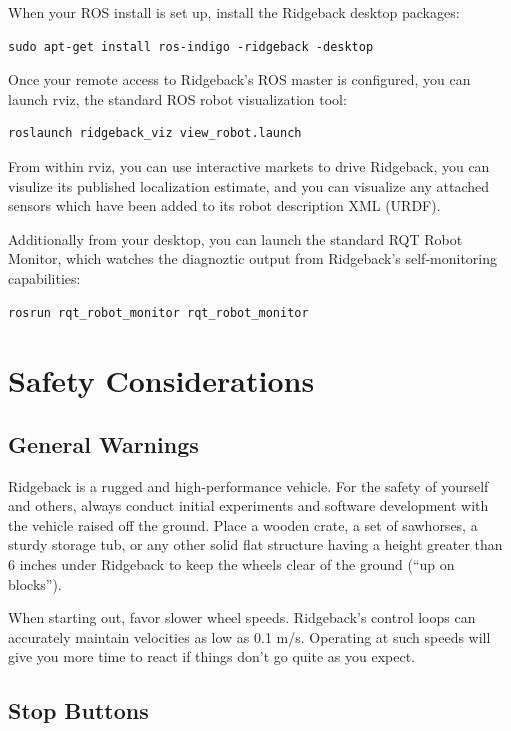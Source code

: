 \documentclass[]{clearpath-latex/clearpath-manual}
\begin{document}
When your ROS install is set up, install the Ridgeback desktop packages:

\begin{lstlisting}
sudo apt-get install ros-indigo -ridgeback -desktop
\end{lstlisting}

Once your remote access to Ridgeback's ROS master is configured, you can launch rviz, the standard ROS robot visualization tool:

\begin{lstlisting}
roslaunch ridgeback_viz view_robot.launch
\end{lstlisting}

From within rviz, you can use interactive markets to drive Ridgeback, you can visulize its published localization estimate, and you can visualize any attached sensors which have been added to its robot description XML (URDF).

Additionally from your desktop, you can launch the standard RQT Robot Monitor, which watches the diagnoztic output from Ridgeback's self-monitoring capabilities:

\begin{lstlisting}
rosrun rqt_robot_monitor rqt_robot_monitor
\end{lstlisting}

\section{Safety Considerations}

\subsection{General Warnings}

Ridgeback is a rugged and high-performance vehicle. For the safety of yourself and others, always conduct initial experiments and software development with the vehicle raised off the ground. Place a wooden crate, a set of sawhorses, a sturdy storage tub, or any other solid flat structure having a height greater than 6 inches under Ridgeback to keep the wheels clear of the ground (“up on blocks”).

When starting out, favor slower wheel speeds. Ridgeback's control loops can accurately maintain velocities as low as 0.1 m/s. Operating at such speeds will give you more time to react if things don’t go quite as you expect.

\subsection{Stop Buttons}
\end{document}
